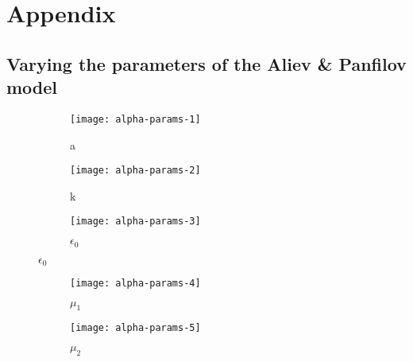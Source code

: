 \appendix
\section{Appendix}
\subsection{Varying the parameters of the Aliev \& Panfilov model}
\label{app:ap-params}

\begin{figure}[h]
    \centering
    \begin{subfigure}[b]{\textwidth}
        \texttt{[image: alpha-params-1]}
        \vspace{-2\baselineskip}
        \caption{a}
    \end{subfigure}
    \begin{subfigure}[b]{\textwidth}
        \texttt{[image: alpha-params-2]}
        \vspace{-2\baselineskip}
        \caption{k}
    \end{subfigure}
    \begin{subfigure}[b]{\textwidth}
        \texttt{[image: alpha-params-3]}
        \vspace{-2\baselineskip}
        \caption{$\epsilon_0$}
    \end{subfigure}
\end{figure}
\begin{figure}[h]
    \ContinuedFloat
    \centering
    \begin{subfigure}[b]{\textwidth}
        \texttt{[image: alpha-params-4]}
        \vspace{-2\baselineskip}
        \caption{$\mu_1$}
    \end{subfigure}
    \begin{subfigure}[b]{\textwidth}
        \texttt{[image: alpha-params-5]}
        \vspace{-2\baselineskip}
        \caption{$\mu_2$}
    \end{subfigure}
    \label{app:ap-params}
    \caption{}
\end{figure}

